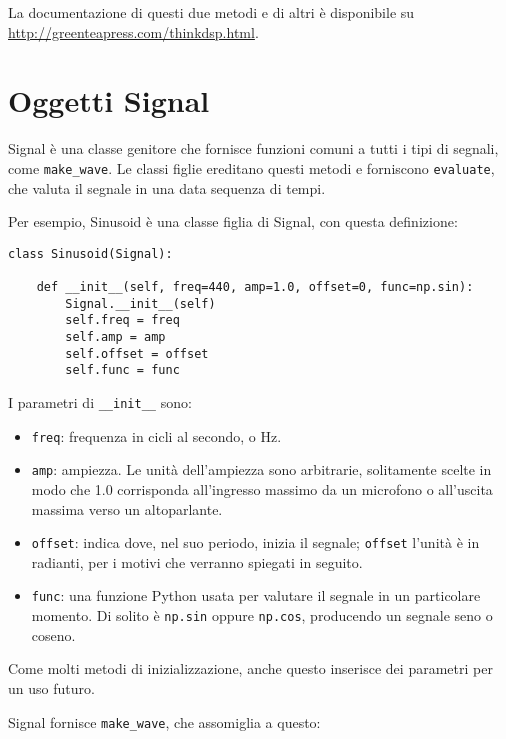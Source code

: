 \documentclass[12pt,a4paper]{book}
\begin{document}
La documentazione di questi due metodi e di altri è disponibile su \url{http://greenteapress.com/thinkdsp.html}.

\section{Oggetti Signal} \label{sigobs} 

Signal è una classe genitore che fornisce funzioni comuni a tutti i tipi di segnali, come \verb"make_wave". Le classi figlie ereditano questi metodi e forniscono {\tt evaluate}, che valuta il segnale in una data sequenza di tempi.

Per esempio, Sinusoid è una classe figlia di Signal, con questa definizione:

\begin{verbatim} 
class Sinusoid(Signal):

    def __init__(self, freq=440, amp=1.0, offset=0, func=np.sin):
        Signal.__init__(self)
        self.freq = freq
        self.amp = amp
        self.offset = offset
        self.func = func
 \end{verbatim} 

I parametri di \verb"__init__" sono:

\begin{itemize} 

\item {\tt freq}: frequenza in cicli al secondo, o Hz.

\item {\tt amp}: ampiezza. Le unità dell'ampiezza sono arbitrarie, solitamente scelte in modo che 1.0 corrisponda all'ingresso massimo da un microfono o all'uscita massima verso un altoparlante.

\item {\tt offset}: indica dove, nel suo periodo, inizia il segnale; {\tt offset} l'unità è in radianti, per i motivi che verranno spiegati in seguito.

\item {\tt func}: una funzione Python usata per valutare il segnale in un particolare momento. Di solito è {\tt np.sin} oppure {\tt np.cos}, producendo un segnale seno o coseno.

\end{itemize} 

Come molti metodi di inizializzazione, anche questo inserisce dei parametri per un uso futuro.

Signal fornisce \verb"make_wave", che assomiglia a questo:
\end{document}
